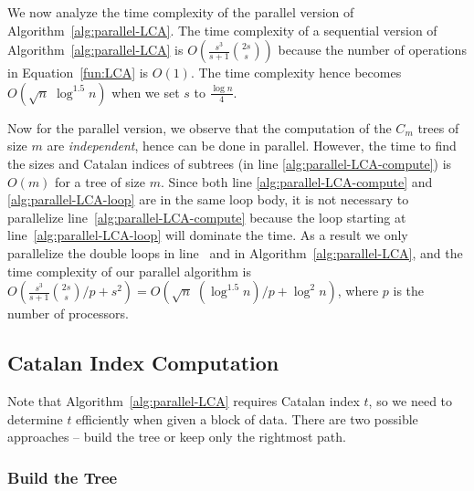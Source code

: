 We now analyze the time complexity of the parallel version of
Algorithm~\ref{alg:parallel-LCA}.  The time complexity of a sequential
version of Algorithm~\ref{alg:parallel-LCA} is $O(\frac{s^3}{s+1}
\binom{2s}{s})$ because the number of operations in
Equation~\ref{fun:LCA} is $O(1)$.  The time complexity hence becomes
$O(\sqrt{n} \; \log ^{1.5} n)$ when we set $s$ to $\frac{\log n}{4}$.

Now for the parallel version, we observe that the computation of the
$C_m$ trees of size $m$ are {\em independent}, hence can be done in
parallel.  However, the time to find the sizes and Catalan indices of
subtrees (in line \ref{alg:parallel-LCA-compute}) is $O(m)$ for a tree
of size $m$.  Since both line \ref{alg:parallel-LCA-compute} and
\ref{alg:parallel-LCA-loop} are in the same loop body, it is not
necessary to parallelize line~\ref{alg:parallel-LCA-compute} because the
loop starting at line~\ref{alg:parallel-LCA-loop} will dominate the
time.  As a result we only parallelize the double loops in
line~\label{alg:parallel-LCA-for-2} and \label{alg:parallel-LCA-for-3}
in Algorithm~\ref{alg:parallel-LCA}, and the time complexity of our
parallel algorithm is $O(\frac{s^3}{s+1} \binom{2s}{s} / p + s^2) =
O(\sqrt{n} \; (\log^{1.5} n) / p + \log^2 n )$, where $p$ is the number
of processors.



\subsection{Catalan Index Computation}

Note that Algorithm~\ref{alg:parallel-LCA} requires Catalan index $t$,
so we need to determine $t$ efficiently when given a block of data.
There are two possible approaches -- build the tree or keep only the
rightmost path.


\subsubsection{Build the Tree}

